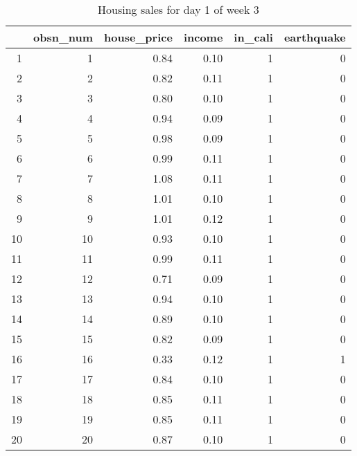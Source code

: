 \begin{table}[ht]
\centering
\begin{tabular}{rrrrrr}
  \hline
 & obsn\_num & house\_price & income & in\_cali & earthquake \\ 
  \hline
1 &   1 & 0.84 & 0.10 &   1 &   0 \\ 
  2 &   2 & 0.82 & 0.11 &   1 &   0 \\ 
  3 &   3 & 0.80 & 0.10 &   1 &   0 \\ 
  4 &   4 & 0.94 & 0.09 &   1 &   0 \\ 
  5 &   5 & 0.98 & 0.09 &   1 &   0 \\ 
  6 &   6 & 0.99 & 0.11 &   1 &   0 \\ 
  7 &   7 & 1.08 & 0.11 &   1 &   0 \\ 
  8 &   8 & 1.01 & 0.10 &   1 &   0 \\ 
  9 &   9 & 1.01 & 0.12 &   1 &   0 \\ 
  10 &  10 & 0.93 & 0.10 &   1 &   0 \\ 
  11 &  11 & 0.99 & 0.11 &   1 &   0 \\ 
  12 &  12 & 0.71 & 0.09 &   1 &   0 \\ 
  13 &  13 & 0.94 & 0.10 &   1 &   0 \\ 
  14 &  14 & 0.89 & 0.10 &   1 &   0 \\ 
  15 &  15 & 0.82 & 0.09 &   1 &   0 \\ 
  16 &  16 & 0.33 & 0.12 &   1 &   1 \\ 
  17 &  17 & 0.84 & 0.10 &   1 &   0 \\ 
  18 &  18 & 0.85 & 0.11 &   1 &   0 \\ 
  19 &  19 & 0.85 & 0.11 &   1 &   0 \\ 
  20 &  20 & 0.87 & 0.10 &   1 &   0 \\ 
   \hline
\end{tabular}
\caption{Housing sales for day 1 of week 3} 
\end{table}

